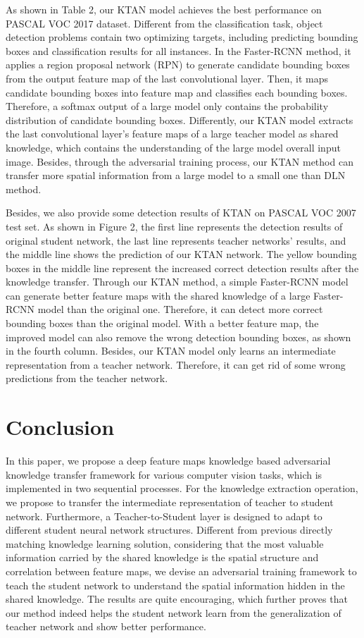 \documentclass[letterpaper]{article} %
\begin{document}
As shown in Table 2, our KTAN model achieves the best performance on PASCAL VOC 2017 dataset. Different from the classification task, object detection problems contain two optimizing targets, including predicting bounding boxes and classification results for all instances. In the Faster-RCNN method, it applies a region proposal network (RPN) to generate candidate bounding boxes from the output feature map of the last convolutional layer. Then, it maps candidate bounding boxes into feature map and classifies each bounding boxes. Therefore, a softmax output of a large model only contains the probability distribution of candidate bounding boxes. Differently, our KTAN model extracts the last convolutional layer’s feature maps of a large teacher model as shared knowledge, which contains the understanding of the large model overall input image. Besides, through the adversarial training process, our KTAN method can transfer more spatial information from a large model to a small one than DLN method.

Besides, we also provide some detection results of KTAN on PASCAL VOC 2007 test set. As shown in Figure 2, the first line represents the detection results of original student network, the last line represents teacher networks' results, and the middle line shows the prediction of our KTAN network. The yellow bounding boxes in the middle line represent the increased correct detection results after the knowledge transfer. Through our KTAN method, a simple Faster-RCNN model can generate better feature maps with the shared knowledge of a large Faster-RCNN model than the original one. Therefore, it can detect more correct bounding boxes than the original model. With a better feature map, the improved model can also remove the wrong detection bounding boxes, as shown in the fourth column. Besides, our KTAN model only learns an intermediate representation from a teacher network. Therefore, it can get rid of some wrong predictions from the teacher network.


\section{Conclusion}

In this paper, we propose a deep feature maps knowledge based adversarial knowledge transfer framework for various computer vision tasks, which is implemented in two sequential processes. For the knowledge extraction operation, we propose to transfer the intermediate representation of teacher to student network. Furthermore, a Teacher-to-Student layer is designed to adapt to different student neural network structures. Different from previous directly matching knowledge learning solution, considering that the most valuable information carried by the shared knowledge is the spatial structure and correlation between feature maps, we devise an adversarial training framework to teach the student network to understand the spatial information hidden in the shared knowledge. The results are quite encouraging, which further proves that our method indeed helps the student network learn from the generalization of teacher network and show better performance.
\end{document}
